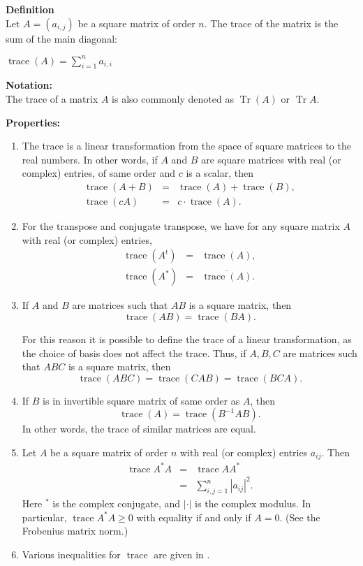 \documentclass{article}
\begin{document}
\textbf{Definition} \\
Let $A=(a_{i,j})$ be a square matrix of
order $n$. 
The trace of the matrix is the sum of the main diagonal:
\begin{center} $\operatorname{trace}(A)= \sum\limits _{i=1} ^{n}
 a_{i,i}$
\end{center}

\textbf{Notation:}\\
The trace of a matrix $A$ is also commonly denoted as $\operatorname{Tr}(A)$ 
or $\operatorname{Tr}A$.
 
\textbf{Properties:}
 \begin{enumerate}
\item  The trace is a linear transformation from the space of square matrices to
 the real numbers. In other words, if $A$ and $B$ are square matrices with real (or complex) entries, 
of same order and $c$ is a scalar, then 
\begin{eqnarray*}
  \operatorname{trace}(A+B) &=& \operatorname{trace}(A)+ \operatorname{trace}(B), \\
  \operatorname{trace}(cA) &=& c\cdot \operatorname{trace}(A).
\end{eqnarray*}
\item For  the transpose and conjugate transpose, we have for any 
square matrix $A$ with real (or complex) entries, 
\begin{eqnarray*} 
\operatorname{trace} (A^t) &=& \operatorname{trace} (A), \\
\operatorname{trace} (A^\ast) &=& \overline{\operatorname{trace} (A)}.
\end{eqnarray*}
\item If $A$ and $B$ are matrices such that $AB$ is a square matrix, then 
$$ \operatorname{trace} (AB) = \operatorname{trace} (BA).$$

For this reason it is possible to define the trace of a linear transformation, as the choice of basis does not affect the trace.
Thus, if $A,B,C$ are matrices such that $ABC$ is a square matrix, then
$$ \operatorname{trace} (ABC) = \operatorname{trace} (CAB) = \operatorname{trace} (BCA).$$
\item If $B$ is in invertible square matrix of same order as $A$, then 
$$ \operatorname{trace} (A) = \operatorname{trace} (B^{-1}A B).$$
In other words, the trace of similar matrices are equal. 
\item Let $A$ be a square matrix of order $n$ with real (or complex)
entries $a_{ij}$. Then
\begin{eqnarray*}
\operatorname{trace} A^\ast A &=& \operatorname{trace} A A^\ast \\
                &=& \sum_{i,j=1}^n |a_{ij}|^2.
\end{eqnarray*}
Here $^\ast$ is the complex conjugate, and $|\cdot|$ is the complex modulus.
In particular, $\operatorname{trace} A^\ast A\ge 0$ with equality if and only if $A=0$.
(See the Frobenius matrix norm.)
\item Various inequalities for $\operatorname{trace}$ are given in 
\cite{yang}.
\end{enumerate}
 
\end{document}
